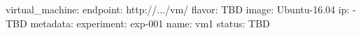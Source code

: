 virtual_machine:
  endpoint: http://.../vm/
  flavor: TBD
  image: Ubuntu-16.04
  ip:
  - TBD
  metadata:
    experiment: exp-001
  name: vm1
  status: TBD
